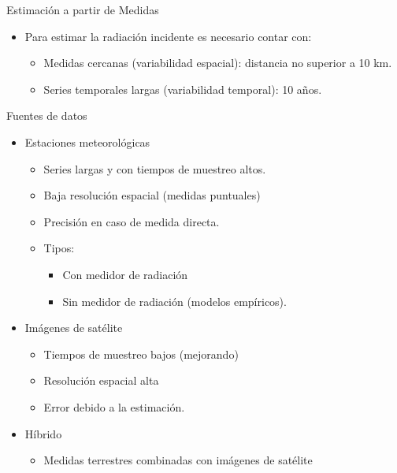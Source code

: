 \documentclass[xcolor={usenames,svgnames,dvipsnames}]{beamer}
\begin{document}
\begin{frame}[label={sec:orga51a0b7}]{Estimación a partir de Medidas}
\begin{itemize}
\item Para estimar la radiación incidente es necesario contar con:
\begin{itemize}
\item \alert{Medidas cercanas} (variabilidad espacial): distancia no superior a 10 km.
\item \alert{Series temporales} largas (variabilidad temporal): 10 años.
\end{itemize}
\end{itemize}
\end{frame}

\begin{frame}[label={sec:org67d295b}]{Fuentes de datos}
\begin{itemize}
\item \alert{Estaciones meteorológicas}
\begin{itemize}
\item Series largas y con tiempos de muestreo altos.
\item Baja resolución espacial (medidas puntuales)
\item Precisión en caso de medida directa.
\item Tipos: 
\begin{itemize}
\item Con medidor de radiación
\item Sin medidor de radiación (modelos empíricos).
\end{itemize}
\end{itemize}
\end{itemize}

\pause

\begin{itemize}
\item \alert{Imágenes de satélite}

\begin{itemize}
\item Tiempos de muestreo bajos (mejorando)

\item Resolución espacial alta

\item Error debido a la estimación.
\end{itemize}
\end{itemize}

\pause 

\begin{itemize}
\item \alert{Híbrido}

\begin{itemize}
\item Medidas terrestres combinadas con imágenes de satélite
\end{itemize}
\end{itemize}
\end{frame}
\end{document}
